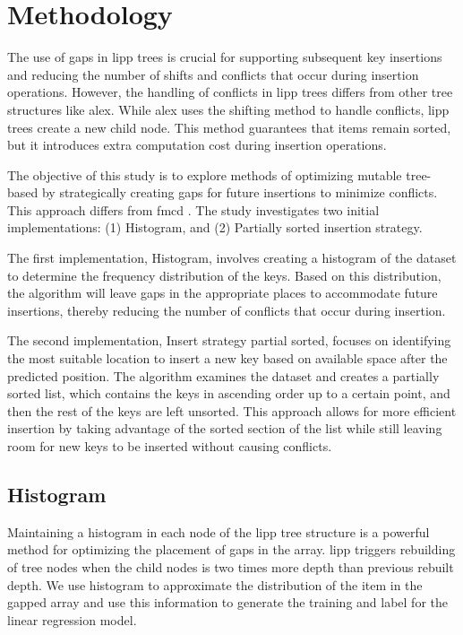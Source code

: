 \section{Methodology} \label{implementation}
The use of gaps in \acrshort{lipp} trees is crucial for supporting subsequent key insertions and reducing the number of shifts and conflicts that occur during insertion operations. However, the handling of conflicts in \acrshort{lipp}  trees differs from other tree structures like \acrshort{alex}. While \acrshort{alex} uses the shifting method to handle conflicts, \acrshort{lipp}  trees create a new child node. This method guarantees that items remain sorted, but it introduces extra computation cost during insertion operations.

The objective of this study is to explore methods of optimizing mutable tree-based \learnindex by strategically creating gaps for future insertions to minimize conflicts. This approach differs from \acrshort{fmcd} \cite{LIPP}. The study investigates two initial implementations: (1) Histogram, and (2) Partially sorted insertion strategy.

The first implementation, Histogram, involves creating a histogram of the dataset to determine the frequency distribution of the keys. Based on this distribution, the algorithm will leave gaps in the appropriate places to accommodate future insertions, thereby reducing the number of conflicts that occur during insertion.

The second implementation, Insert strategy partial sorted, focuses on identifying the most suitable location to insert a new key based on available space after the predicted position. The algorithm examines the dataset and creates a partially sorted list, which contains the keys in ascending order up to a certain point, and then the rest of the keys are left unsorted. This approach allows for more efficient insertion by taking advantage of the sorted section of the list while still leaving room for new keys to be inserted without causing conflicts.

\subsection{Histogram}
Maintaining a histogram in each node of the \acrshort{lipp} tree structure is a powerful method for optimizing the placement of gaps in the array. \acrshort{lipp} triggers rebuilding of tree nodes when the child nodes is two times more depth than previous rebuilt depth. We use histogram to approximate the distribution of the item in the gapped array and use this information to generate the training and label for the linear regression model. 

